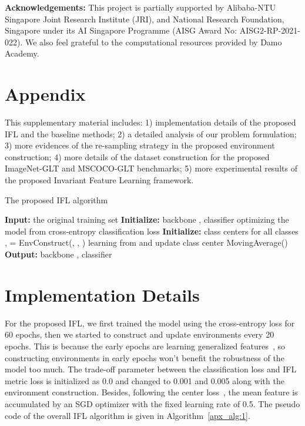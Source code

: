 \documentclass{article}
\begin{document}
 
\noindent\textbf{Acknowledgements:} This project is partially supported by Alibaba-NTU Singapore Joint Research Institute (JRI), and National Research Foundation, Singapore under its AI Singapore Programme (AISG Award No: AISG2-RP-2021-022). We also feel grateful to the computational resources provided by Damo Academy.




\appendix



\section{Appendix} 
This supplementary material includes: 1) implementation details of the proposed IFL and the baseline methods; 2) a detailed analysis of our problem formulation; 3) more evidences of the re-sampling strategy in the proposed environment construction; 4) more details of the dataset construction for the proposed ImageNet-GLT and MSCOCO-GLT benchmarks; 5) more experimental results of the proposed Invariant Feature Learning framework.


\begin{algorithm}[H]
        \caption{The proposed IFL algorithm}
        \begin{algorithmic}
          \STATE \textbf{Input:} the original training set 
          \STATE \textbf{Initialize:} backbone , classifier 
            \STATE  optimizing the model from cross-entropy classification loss
            \STATE 
          \ENDFOR
          \STATE \textbf{Initialize:} class centers  for all classes
          \REPEAT
          \STATE ,  = EnvConstruct(, , )
             \STATE  learning from  and 
             \STATE 
             \STATE  update class center
             \STATE  MovingAverage()
          \ENDFOR
          \STATE \textbf{Output: } backbone , classifier 
        \end{algorithmic}
        \label{apx_alg:1}
\end{algorithm}

\section{Implementation Details} 

For the proposed IFL, we first trained the model using the cross-entropy loss for 60 epochs, then we started to construct and update environments every 20 epochs. This is because the early epochs are learning generalized features~\cite{prechelt1998early,zhang2021understanding}, so constructing environments in early epochs won't benefit the robustness of the model too much. The trade-off parameter  between the classification loss and IFL metric loss is initialized as 0.0 and changed to 0.001 and 0.005 along with the environment construction. Besides, following the center loss~\cite{wen2016centerloss}, the mean feature is accumulated by an SGD optimizer with the fixed learning rate of 0.5. The pseudo code of the overall IFL algorithm is given in Algorithm~\ref{apx_alg:1}. 
\end{document}
